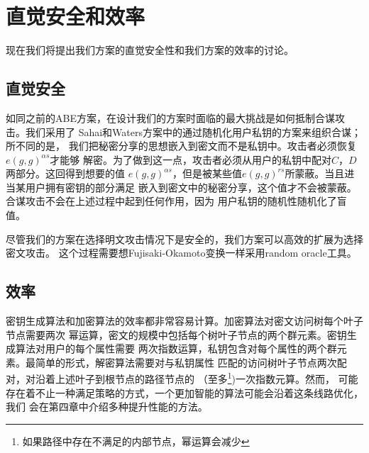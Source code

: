 \section{直觉安全和效率}
现在我们将提出我们方案的直觉安全性和我们方案的效率的讨论。
\subsection{直觉安全}
如同之前的ABE方案，在设计我们的方案时面临的最大挑战是如何抵制合谋攻击。我们采用了
Sahai和Waters方案\cite{SW:FuzzyIBE}中的通过随机化用户私钥的方案来组织合谋；所不同的是，
我们把秘密分享的思想嵌入到密文而不是私钥中。攻击者必须恢复$e(g,g)^{\alpha s}$才能够
解密。为了做到这一点，攻击者必须从用户的私钥中配对$C$，$D$两部分。这回得到想要的值
$e(g,g)^{\alpha s}$，但是被某些值$e(g,g)^{rs}$所蒙蔽。当且进当某用户拥有密钥的部分满足
嵌入到密文中的秘密分享，这个值才不会被蒙蔽。合谋攻击不会在上述过程中起到任何作用，因为
用户私钥的随机性随机化了盲值。\par
尽管我们的方案在选择明文攻击情况下是安全的，我们方案可以高效的扩展为选择密文攻击。
这个过程需要想Fujisaki-Okamoto变换\cite{FO}一样采用random oracle工具。
\subsection{效率}
密钥生成算法和加密算法的效率都非常容易计算。加密算法对密文访问树每个叶子节点需要两次
幂运算，密文的规模中包括每个树叶子节点的两个群元素。密钥生成算法对用户的每个属性需要
两次指数运算，私钥包含对每个属性的两个群元素。最简单的形式，解密算法需要对与私钥属性
匹配的访问树叶子节点两次配对，对沿着上述叶子到根节点的路径节点的
（至多\footnote{如果路径中存在不满足的内部节点，幂运算会减少})一次指数元算。然而，
可能存在着不止一种满足策略的方式，一个更加智能的算法可能会沿着这条线路优化，我们
会在第四章中介绍多种提升性能的方法。
